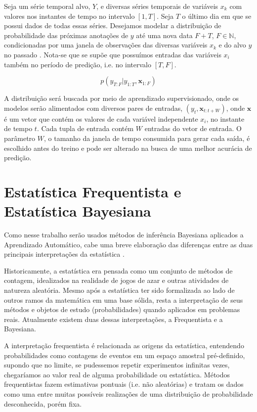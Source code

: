 Seja um série temporal alvo, $Y$, e diversas séries temporais de variáveis
 $x_k$ com valores nos instantes de tempo no intervalo $[1,T]$. Seja $T$ o último dia em que se possui dados de todas essas
séries. Desejamos modelar a distribuição de probabilidade das próximas anotações
de $y$ até uma nova data $F + T$, $F \in \mathbb{N}$, condicionadas por uma janela de
observações das diversas variáveis  $x_k$ e do alvo $y$ no passado
\citep{deepfactors}. Nota-se que se supõe que possuímos entradas das
variáveis $x_i$ também no período de predição, i.e. no intervalo $[T,F]$.

\[ p(y_{T:F} | y_{1:T},\textbf{x}_{{1}:F}) \]

A distribuição será buscada por meio de aprendizado supervisionado, onde os
modelos serão alimentados com diversos pares de entradas,
$(y_t,\textbf{x}_{t:t+W})$, onde $\textbf{x}$ é um vetor que contém os valores de
cada variável independente $x_i$, no instante de tempo $t$. Cada tupla de
entrada contém $W$ entradas do vetor de entrada. O parâmetro $W$, o
tamanho da janela de tempo consumida para gerar cada saída, é escolhido antes do
treino e pode ser alterado na busca de uma melhor acurácia de predição.



\section{Estatística Frequentista e Estatística Bayesiana}
 
Como nesse trabalho serão usados métodos de inferência Bayesiana aplicados a Aprendizado Automático,
cabe uma breve elaboração das diferenças entre as duas principais
interpretações da estatística \citep{dlbook}. 

Historicamente, a estatística era pensada como um conjunto de métodos de
contagem, idealizados na realidade de jogos de azar e outras atividades de
natureza aleatória. Mesmo após a estatística ter sido formalizada ao lado de
outros ramos da matemática em uma base sólida, resta a interpretação de seus
métodos e objetos de estudo (probabilidades) quando aplicados em problemas
reais. Atualmente existem duas dessas interpretações, a Frequentista e a
Bayesiana.

A interpretação frequentista é relacionada as origens da estatística, entendendo
probabilidades como contagens de eventos em um espaço amostral pré-definido,
supondo que no limite, se pudessemos repetir experimentos infinitas vezes,
chegaríamos ao valor real de alguma probabilidade ou estatística. Métodos
frequentistas fazem estimativas pontuais (i.e. não aleatórias) e tratam os dados como uma entre muitas
possíveis realizações de uma distribuição de probabilidade desconhecida, porém fixa. 

